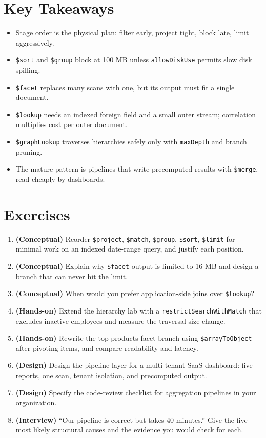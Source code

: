 \section*{Key Takeaways}
\begin{itemize}
    \item Stage order is the physical plan: filter early, project tight, block late, limit aggressively.
    \item \texttt{\$sort} and \texttt{\$group} block at 100 MB unless \texttt{allowDiskUse} permits slow disk spilling.
    \item \texttt{\$facet} replaces many scans with one, but its output must fit a single document.
    \item \texttt{\$lookup} needs an indexed foreign field and a small outer stream; correlation multiplies cost per outer document.
    \item \texttt{\$graphLookup} traverses hierarchies safely only with \texttt{maxDepth} and branch pruning.
    \item The mature pattern is pipelines that write precomputed results with \texttt{\$merge}, read cheaply by dashboards.
\end{itemize}

\section{Exercises}
\begin{enumerate}
    \item \textbf{(Conceptual)} Reorder \texttt{\$project}, \texttt{\$match}, \texttt{\$group}, \texttt{\$sort}, \texttt{\$limit} for minimal work on an indexed date-range query, and justify each position.
    \item \textbf{(Conceptual)} Explain why \texttt{\$facet} output is limited to 16 MB and design a branch that can never hit the limit.
    \item \textbf{(Conceptual)} When would you prefer application-side joins over \texttt{\$lookup}?
    \item \textbf{(Hands-on)} Extend the hierarchy lab with a \texttt{restrictSearchWithMatch} that excludes inactive employees and measure the traversal-size change.
    \item \textbf{(Hands-on)} Rewrite the top-products facet branch using \texttt{\$arrayToObject} after pivoting items, and compare readability and latency.
    \item \textbf{(Design)} Design the pipeline layer for a multi-tenant SaaS dashboard: five reports, one scan, tenant isolation, and precomputed output.
    \item \textbf{(Design)} Specify the code-review checklist for aggregation pipelines in your organization.
    \item \textbf{(Interview)} ``Our pipeline is correct but takes 40 minutes.'' Give the five most likely structural causes and the evidence you would check for each.
\end{enumerate}

